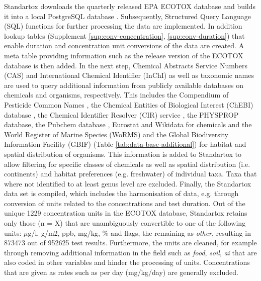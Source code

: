 Standartox downloads the quarterly released EPA ECOTOX database and builds it into a local PostgreSQL database \citep{szocs_build_2019}. Subsequently, Structured Query Language (SQL) functions for further processing the data are implemented. In addition lookup tables (Supplement \ref{sup:conv-concentration}, \ref{sup:conv-duration}) that enable duration and concentration unit conversions of the data are created. A meta table providing information such as the release version of the ECOTOX database is then added. In the next step, Chemical Abstracts Service Numbers (CAS) and International Chemical Identifier (InChI) as well as taxonomic names are used to query additional information from publicly available databases on chemicals and organisms, respectively. This includes the Compendium of Pesticide Common Names \citep{wood_compendium_2019}, the Chemical Entities of Biological Interest (ChEBI) database \citep{hastings_chebi_2016}, the Chemical Identifier Resolver (CIR) service \citep{nationalinstitutesofhealthnih_chemical_2019}, the PHYSPROP database, the Pubchem database \citep{kim_pubchem_2016}, Eurostat \citep{europeancommission_eurostat_2019} and Wikidata \citep{vrandecic_wikidata_2014} for chemicals and the World Register of Marine Species (WoRMS) \citep{wormseditorialboard_world_2018} and the Global Biodiversity Information Facility (GBIF) \citep{_gbif_2019} (Table \ref{tab:data-base-additional}) for habitat and spatial distribution of organisms. This information is added to Standartox to allow filtering for specific classes of chemicals as well as spatial distribution (i.e. continents) and habitat preferences (e.g. freshwater) of individual taxa. Taxa that where not identified to at least genus level are excluded. Finally, the Standartox data set is compiled, which includes the harmonisation of data, e.g. through conversion of units related to the concentrations and test duration. Out of the unique 1229 concentration units in the ECOTOX database, Standartox retains only those (n = X) that are unambiguously convertible to one of the following units: $\mu$g/l, g/m2, ppb, mg/kg, \% and flags, the remaining as \textit{other}, resulting in 873473 out of 952625 test results. Furthermore, the units are cleaned, for example through removing additional information in the field such as \textit{food}, \textit{soil}, \textit{ai} that are also coded in other variables and hinder the processing of units. Concentrations that are given as rates such as per day (mg/kg/day) are generally excluded.
